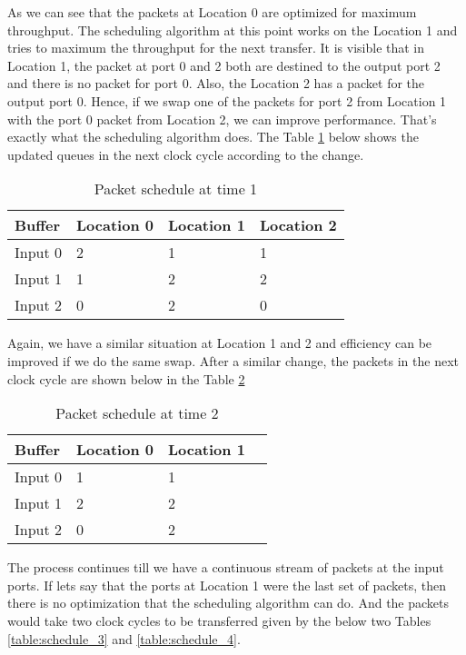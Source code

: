\documentclass[twoside,12pt,fleqn]{book} %
\begin{document}
As we can see that the packets at Location 0 are optimized for maximum throughput. The scheduling algorithm at this point works on the Location 1 and tries to maximum the throughput for the next transfer. It is visible that in Location 1, the packet at port 0 and 2 both are destined to the output port 2 and there is no packet for port 0. Also, the Location 2 has a packet for the output port 0. Hence, if we swap one of the packets for port 2 from Location 1 with the port 0 packet from Location 2, we can improve performance. That's exactly what the scheduling algorithm does. The Table \ref{table:schedule_1} below shows the updated queues in the next clock cycle according to the change.
\begin{table}[h!]
\begin{center}
    \begin{tabular}{| l | l | l | l |}
    \hline
    Buffer & Location 0 & Location 1 & Location 2\\ \hline
    Input 0 & 2 & 1 & 1\\ \hline
    Input 1 & 1 & 2 & 2 \\ \hline
    Input 2 & 0 & 2 & 0\\ \hline
    \end{tabular}
    \caption{Packet schedule at time 1}
	\label{table:schedule_1}
\end{center}
\end{table}

Again, we have a similar situation at Location 1 and 2 and efficiency can be improved if we do the same swap. After a similar change, the packets in the next clock cycle are shown below in the Table \ref{table:schedule_2}
\begin{table}[h!]
\begin{center}
    \begin{tabular}{| l | l | l | l |}
    \hline
    Buffer & Location 0 & Location 1\\ \hline
    Input 0 & 1 & 1\\ \hline
    Input 1 & 2 & 2 \\ \hline
    Input 2 & 0 & 2\\ \hline
    \end{tabular}
    \caption{Packet schedule at time 2}
	\label{table:schedule_2}
\end{center}
\end{table}

The process continues till we have a continuous stream of packets at the input ports. If lets say that the ports at Location 1 were the last set of packets, then there is no optimization that the scheduling algorithm can do. And the packets would take two clock cycles to be transferred given by the below two Tables \ref{table:schedule_3} and \ref{table:schedule_4}.
\end{document}
